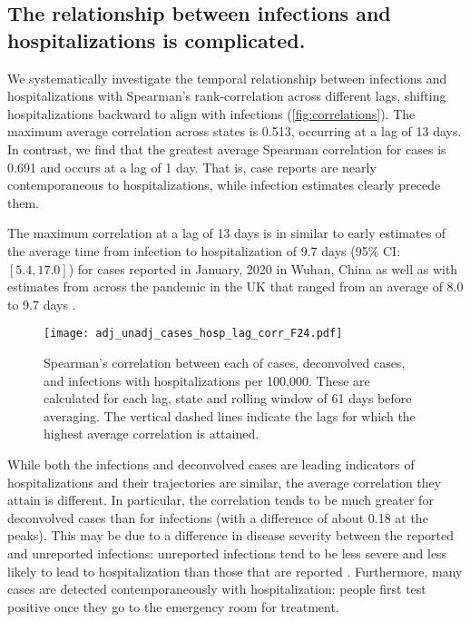 \subsection{The relationship between infections and hospitalizations is complicated.}
\label{sec:lagged-correlations}

We systematically investigate the temporal relationship between infections and
hospitalizations with Spearman's rank-correlation across different lags,
shifting hospitalizations backward to align with infections
(\autoref{fig:correlations}). The maximum average correlation across states is
0.513, occurring at a lag of 13 days. In contrast, we find that the greatest
average Spearman correlation for cases is 0.691 and occurs at a lag of 1 day.
That is, case reports are nearly contemporaneous to hospitalizations, while
infection estimates clearly precede them. 

The maximum correlation at a lag of 13 days is in similar to early estimates of
the average time from infection to hospitalization of 9.7 days (95\% CI: $[5.4,
17.0]$) for cases reported in January, 2020 in Wuhan, China as well as with
estimates from across the pandemic in the UK that ranged from an average of 8.0
to 9.7 days \citep{ward2021understanding}. 

\begin{figure}[!tb]
\centering
\texttt{[image: adj\_unadj\_cases\_hosp\_lag\_corr\_F24.pdf]} 
\caption{Spearman's correlation between each of cases, deconvolved cases, and
infections with hospitalizations per 100,000. These are calculated for each lag,
state and rolling window of 61 days before averaging. The vertical dashed lines
indicate the lags for which the highest average correlation is attained.
}
\label{fig:correlations}
\end{figure}
    

While both the infections and deconvolved cases are leading indicators of
hospitalizations and their trajectories are similar, the average correlation
they attain is different. In particular, the correlation tends to be much
greater for deconvolved cases than for infections (with a difference of about
0.18 at the peaks). This may be due to a difference in disease severity between
the reported and unreported infections: unreported infections tend to be less
severe and less likely to lead to hospitalization than those that are reported
\citep{sallahi2021using}. Furthermore, many cases are detected contemporaneously
with hospitalization: people first test positive once they go to the emergency
room for treatment.



